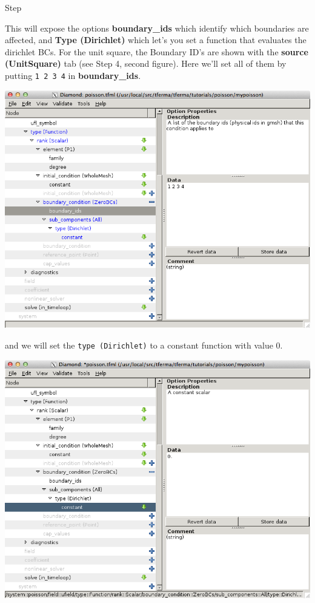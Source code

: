 \begin{steps}{Step}
\begin{center}
\end{center}
This will expose the options \textbf{boundary\_ids} which identify
which boundaries are affected, and \textbf{Type (Dirichlet)} which
let's you set a function that evaluates the dirichlet BCs.  For the
unit square,  the Boundary ID's are shown with the \textbf{source
  (UnitSquare)} tab (see Step 4, second figure).  Here we'll set all
of them by putting \texttt{1 2 3 4} in \textbf{boundary\_ids}.  
\begin{center}
    \includegraphics[width=\diamondwidth]{figures/screendumps/diamond_poisson_08c.png}
\end{center}
and we will set the \texttt{type (Dirichlet)} to a constant function
with value 0.
\begin{center}
    \includegraphics[width=\diamondwidth]{figures/screendumps/diamond_poisson_08d.png}

\end{center}
\end{steps}
